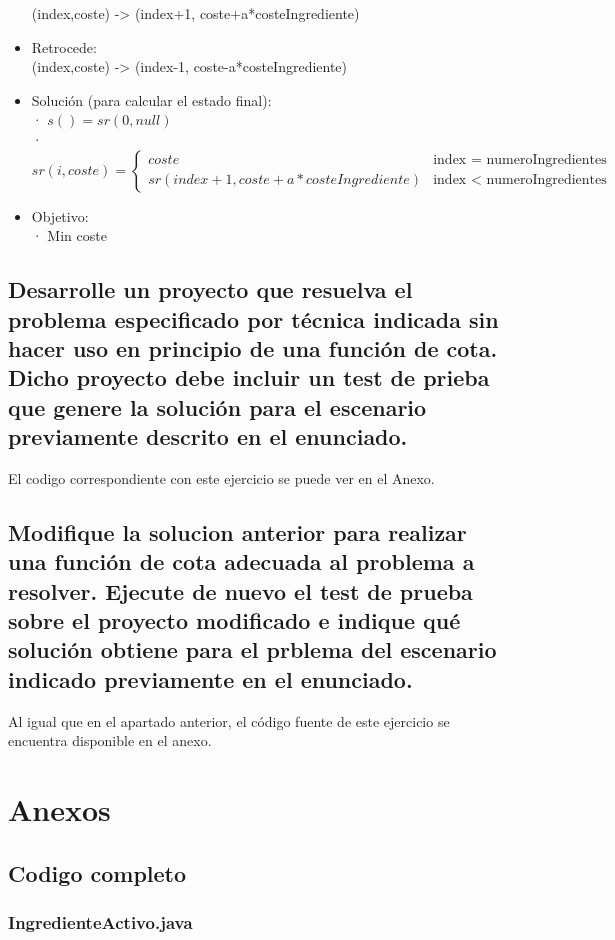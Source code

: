 \documentclass[a4paper,12pt]{article}
\begin{document}
\begin{itemize}
      (index,coste) -> (index+1, coste+a*costeIngrediente)
\item Retrocede:\\
      (index,coste) -> (index-1, coste-a*costeIngrediente)
\item Solución (para calcular el estado final):\\
      · $s() = sr(0,null)$\\
      · $sr(i, coste) =
      \begin{cases}
      coste  &\mbox{index = numeroIngredientes}\\
      sr(index+1, coste+a*costeIngrediente) &\mbox{index < numeroIngredientes}
      \end{cases}$

\item Objetivo:\\
      · Min coste


\end{itemize}


\subsection{Desarrolle un proyecto que resuelva el problema especificado por técnica indicada sin hacer uso en principio de una función de cota. Dicho proyecto debe incluir un test de prieba que genere la solución para el escenario previamente descrito en el enunciado.}
El codigo correspondiente con este ejercicio se puede ver en el Anexo.
\subsection{Modifique la solucion anterior para realizar una función de cota adecuada al problema a resolver. Ejecute de nuevo el test de prueba sobre el proyecto modificado e indique qué solución obtiene para el prblema del escenario indicado previamente en el enunciado.}
Al igual que en el apartado anterior, el código fuente de este ejercicio se encuentra disponible en el anexo.

\section{Anexos}
\subsection{Codigo completo}
\subsubsection{IngredienteActivo.java}
\inputminted[fontsize=\footnotesize,breaklines]{java}{src/andalu30/PracticaIndividual2/IngredienteActivo.java}
\end{document}
